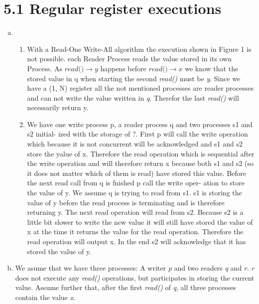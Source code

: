 \documentclass{article}
\begin{document}
	\pagestyle{fancy}
	
    \section*{5.1 Regular register executions}
    \begin{enumerate}[a)]
        \item
        \begin{enumerate}[1.]
            \item With a Read-One Write-All algorithm the execution shown in Figure 1 is not possible.
            each Reader Process reads the value stored in its own Process. 
            As $\textit{read()} \rightarrow y$ happens before $\textit{read()} \rightarrow x$ we know that the stored value in q when starting the second \textit{read()} must be \textit{y}.
            Since we have a (1, N) register all the not mentioned processes are reader processes and can not write the value written in \textit{q}. Therefor the last \textit{read()} will necessarily return y.
            \item We have one write process p, a reader process q and two processes s1 and s2 initial-
            ized with the storage of ?. First p will call the write operation which because it is
            not concurrent will be acknowledged and s1 and s2 store the yalue of x. Therefore
            the read operation which is sequential after the write operation and will therefore
            return x because both s1 and s2 (so it does not matter which of them is read) have
            stored this value. Before the next read call from q is fnished p call the write oper-
            ation to store the value of y. We assume q is trying to read from s1. s1 is storing
            the value of y before the read process is terminating and is therefore returning y.
            The next read operation will read from s2. Because s2 is a little bit slower to write
            the new value it will still have stored the value of x at the time it returns the value
            for the read operation. Therefore the read operation will output x. In the end s2
            will acknowledge that it has stored the value of y.
        \end{enumerate}
        \item We asume that we have three processes: A writer \textit{p} and two readers \textit{q} and \textit{r}.
        \textit{r} does not execute any \textit{read()} operations, but participates in storing the current value.
        Assume further that, after the first \textit{read()} of \textit{q}, all three processes contain the value \textit{x}.

\end{enumerate}
\end{document}
